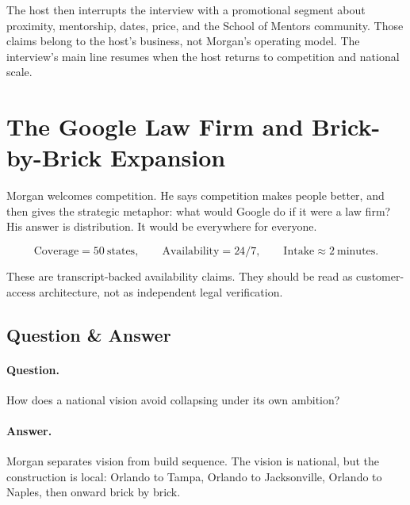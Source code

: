 The host then interrupts the interview with a promotional segment about proximity, mentorship, dates, price, and the School of Mentors community. Those claims belong to the host's business, not Morgan's operating model. The interview's main line resumes when the host returns to competition and national scale.

\section{The Google Law Firm and Brick-by-Brick Expansion}

Morgan welcomes competition. He says competition makes people better, and then gives the strategic metaphor: what would Google do if it were a law firm? His answer is distribution. It would be everywhere for everyone.

\begin{equation}
\mathrm{Coverage}=50\ \mathrm{states},
\qquad
\mathrm{Availability}=24/7,
\qquad
\mathrm{Intake}\approx 2\ \mathrm{minutes}.
\end{equation}

These are transcript-backed availability claims. They should be read as customer-access architecture, not as independent legal verification.

\subsection{Question \& Answer}

\paragraph{Question.}
How does a national vision avoid collapsing under its own ambition?

\paragraph{Answer.}
Morgan separates vision from build sequence. The vision is national, but the construction is local: Orlando to Tampa, Orlando to Jacksonville, Orlando to Naples, then onward brick by brick.

